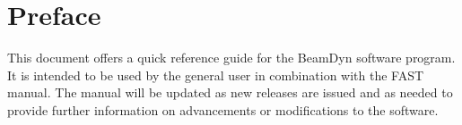 \chapter*{Preface}
This document offers a quick reference guide for the BeamDyn software program. It is intended to be used by the general user in combination with the FAST manual. The manual will be updated as new releases are issued and as needed to provide further information on advancements or modifications to the software.